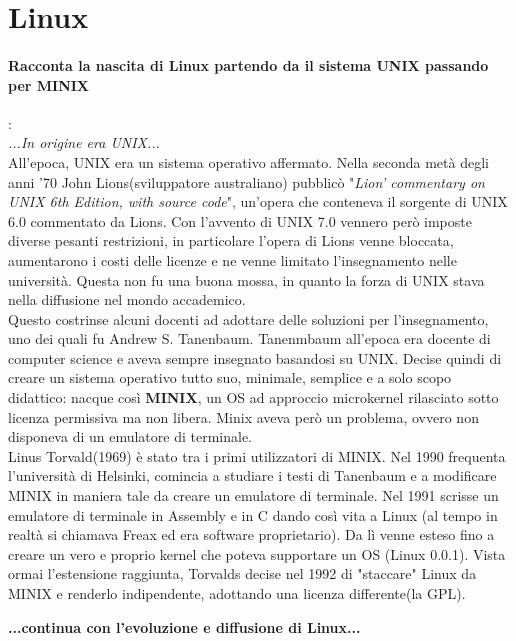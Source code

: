 \documentclass[a4paper]{article}
\begin{document}
	\section{Linux}
		
		\paragraph{Racconta la nascita di Linux partendo da il sistema UNIX passando per MINIX}: \\
		\textit{...In origine era UNIX...}\\
		All'epoca, UNIX era un sistema operativo affermato. Nella seconda metà degli anni '70 John Lions(sviluppatore australiano) pubblicò "\textit{Lion' commentary on UNIX 6th Edition, with source code}", un'opera che conteneva il sorgente di UNIX 6.0 commentato da Lions. Con l'avvento di UNIX 7.0 vennero però imposte diverse pesanti restrizioni, in particolare l'opera di Lions venne bloccata, aumentarono i costi delle licenze e ne venne limitato l'insegnamento nelle università. Questa non fu una buona mossa, in quanto la forza di UNIX stava nella diffusione nel mondo accademico.\\
		Questo costrinse alcuni docenti ad adottare delle soluzioni per l'insegnamento, uno dei quali fu Andrew S. Tanenbaum.
		Tanenmbaum all'epoca era docente di computer science e aveva sempre insegnato basandosi su UNIX. Decise quindi di creare un sistema operativo tutto suo,  minimale, semplice e a solo scopo didattico: nacque così \textbf{MINIX}, un OS ad approccio microkernel rilasciato sotto licenza permissiva ma non libera.
		Minix aveva però un problema, ovvero non disponeva di un emulatore di terminale.\\
		Linus Torvald(1969) è stato tra i primi utilizzatori di MINIX. Nel 1990 frequenta l'università di Helsinki, comincia a studiare i testi di Tanenbaum e a modificare MINIX in maniera tale da creare un emulatore di terminale. Nel 1991 scrisse un emulatore di terminale in Assembly e in C dando così vita a Linux (al tempo in realtà si chiamava Freax ed era software proprietario). Da lì venne esteso fino a creare un vero e proprio kernel che poteva supportare un OS (Linux 0.0.1). Vista ormai l'estensione raggiunta, Torvalds decise nel 1992 di "staccare" Linux da MINIX e renderlo indipendente, adottando una licenza differente(la GPL).
		
		\textbf{...continua con l'evoluzione e diffusione di Linux...}
		
		
\end{document}
